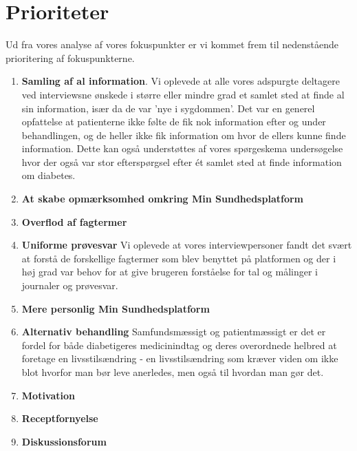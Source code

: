 \section{Prioriteter}
Ud fra vores analyse af vores fokuspunkter er vi kommet frem til nedenstående prioritering af fokuspunkterne.\\
\begin{enumerate}
	\item \textbf{Samling af al information}. Vi oplevede at alle vores adspurgte deltagere ved interviewsne ønskede i større eller mindre grad et samlet sted at finde al sin information, især da de var 'nye i sygdommen'. Det var en generel opfattelse at patienterne ikke følte de fik nok information efter og under behandlingen, og de heller ikke fik information om hvor de ellers kunne finde information. Dette kan også understøttes af vores spørgeskema undersøgelse hvor der også var stor efterspørgsel efter ét samlet sted at finde information om diabetes.
	\item \textbf{At skabe opmærksomhed omkring Min Sundhedsplatform}
	\item \textbf{Overflod af fagtermer}
	\item \textbf{Uniforme prøvesvar} Vi oplevede at vores interviewpersoner fandt det svært at forstå de forskellige fagtermer som blev benyttet på platformen og der i høj grad var behov for at give brugeren forståelse for tal og målinger i journaler og prøvesvar.
	\item \textbf{Mere personlig Min Sundhedsplatform}
	\item \textbf{Alternativ behandling} Samfundsmæssigt og patientmæssigt er det er fordel for både diabetigeres medicinindtag og deres overordnede helbred at foretage en livsstilsændring - en livsstilsændring som kræver viden om ikke blot hvorfor man bør leve anerledes, men også til hvordan man gør det.
	\item \textbf{Motivation}
	\item \textbf{Receptfornyelse}
	\item \textbf{Diskussionsforum}
\end{enumerate}
